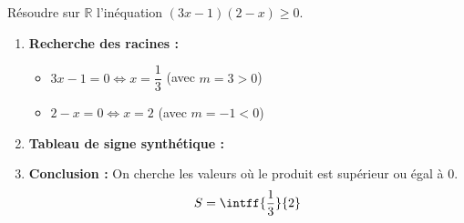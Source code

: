 \begin{methode}
	Résoudre sur $\mathbb{R}$ l'inéquation $(3x - 1)(2 - x) \ge 0$.

	\begin{correction}
		\nline
		\begin{enumerate}
			\item \textbf{Recherche des racines :}
			      \begin{itemize}
				      \item $3x - 1 = 0 \iff x = \dfrac{1}{3}$ \quad (avec $m = 3 > 0$)
				      \item $2 - x = 0 \iff x = 2$ \quad (avec $m = -1 < 0$)
			      \end{itemize}
			\item \textbf{Tableau de signe synthétique :}
			      \begin{center}
			      \end{center}
			\item \textbf{Conclusion :} On cherche les valeurs où le produit est supérieur ou égal à 0.
			      \[
				      S = \intff{\frac{1}{3}}{2}
			      \]
		\end{enumerate}
	\end{correction}
\end{methode}

